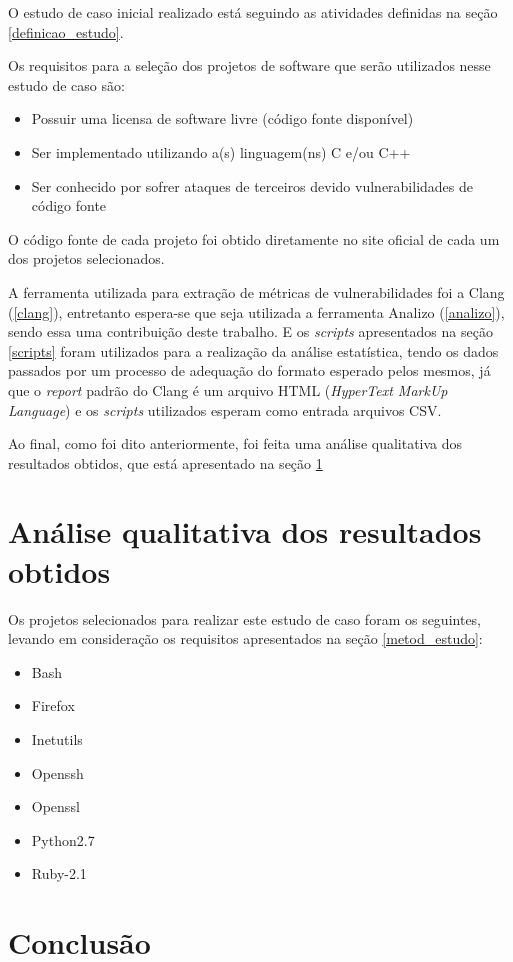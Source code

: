 O estudo de caso inicial realizado está seguindo as atividades definidas na seção \ref{definicao_estudo}.

Os requisitos para a seleção dos projetos de software que serão utilizados nesse estudo de caso são:

\begin{itemize}
  \item Possuir uma licensa de software livre (código fonte disponível)
  \item Ser implementado utilizando a(s) linguagem(ns) C e/ou C++
  \item Ser conhecido por sofrer ataques de terceiros devido vulnerabilidades de código fonte
\end{itemize}

O código fonte de cada projeto foi obtido diretamente no site oficial de cada um dos projetos selecionados.

A ferramenta utilizada para extração de métricas de vulnerabilidades foi a Clang (\ref{clang}), entretanto espera-se que seja utilizada
a ferramenta Analizo (\ref{analizo}), sendo essa uma contribuição deste trabalho. E os \textit{scripts} apresentados na seção 
\ref{scripts} foram utilizados para a realização da análise estatística, tendo os dados passados por um processo de adequação do 
formato esperado pelos mesmos, já que o \textit{report} padrão do Clang é um arquivo HTML (\textit{HyperText MarkUp Language}) e os 
\textit{scripts} utilizados esperam como entrada arquivos CSV.

Ao final, como foi dito anteriormente, foi feita uma análise qualitativa dos resultados obtidos, que está apresentado na seção
\ref{analise_estudo}

\section{Análise qualitativa dos resultados obtidos} \label{analise_estudo}

Os projetos selecionados para realizar este estudo de caso foram os seguintes, levando em consideração os requisitos apresentados na
seção \ref{metod_estudo}:

\begin{itemize}
  \item Bash
  \item Firefox
  \item Inetutils
  \item Openssh
  \item Openssl
  \item Python2.7
  \item Ruby-2.1
\end{itemize}



\section{Conclusão}
